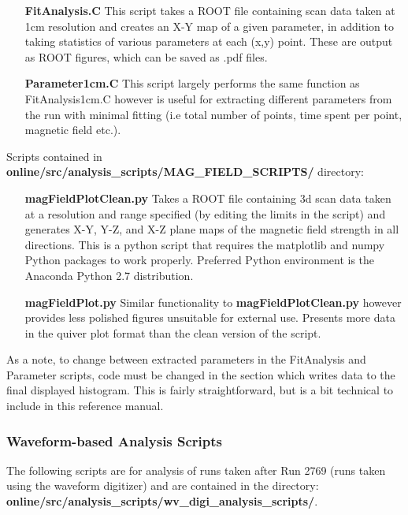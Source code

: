 \documentclass[twoside,letterpaper]{refart}
\begin{document}
\begin{enumerate}
	
	\item[\textbf{FitAnalysis.C}] This script takes a ROOT file containing scan data taken at 1cm resolution and creates an X-Y map of a given parameter, in addition to taking statistics of various parameters at each (x,y) point. These are output as ROOT figures, which can be saved as .pdf files.
	\item[\textbf{Parameter1cm.C}] This script largely performs the same function as FitAnalysis1cm.C however is useful for extracting different parameters from the run with minimal fitting (i.e total number of points, time spent per point, magnetic field etc.).
	
\end{enumerate}

Scripts contained in \textbf{online/src/analysis\_scripts/MAG\_FIELD\_SCRIPTS/} directory:

\begin{enumerate}

	\item[\textbf{magFieldPlotClean.py}] Takes a ROOT file containing 3d scan data taken at a resolution and range specified (by editing the limits in the script) and generates X-Y, Y-Z, and X-Z plane maps of the magnetic field strength in all directions.  This is a python script that requires the matplotlib and numpy Python packages to work properly. Preferred Python environment is the Anaconda Python 2.7 distribution. 
	\item[\textbf{magFieldPlot.py}] Similar functionality to \textbf{magFieldPlotClean.py} however provides less polished figures unsuitable for external use. Presents more data in the quiver plot format than the clean version of the script.

\end{enumerate}

As a note, to change between extracted parameters in the FitAnalysis and Parameter scripts, code must be changed in the section which writes data to the final displayed histogram. This is fairly straightforward, but is a bit technical to include in this reference manual.

\subsubsection{Waveform-based Analysis Scripts}

The following scripts are for analysis of runs taken after Run 2769 (runs taken using the waveform digitizer) and are contained in the directory: \textbf{online/src/analysis\_scripts/wv\_digi\_analysis\_scripts/}. 
\end{document}
